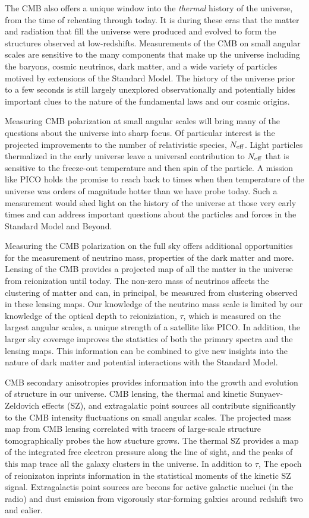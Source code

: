 \documentclass[PICOReport.tex]{subfiles}
\begin{document}
\vskip 10pt
The CMB also offers a unique window into the {\it thermal} history of the universe, from the time of reheating through today.  It is during these eras that the matter and radiation that fill the universe were produced and evolved to form the structures observed at low-redshifts.  Measurements of the CMB on small angular scales are sensitive to the many components that make up the universe including the baryons, cosmic neutrinos, dark matter, and a wide variety of particles motived by extensions of the Standard Model.  The history of the universe prior to a few seconds is still largely unexplored observationally and potentially hides important clues to the nature of the fundamental laws and our cosmic origins.

Measuring CMB polarization at small angular scales will bring many of the questions about the universe into sharp focus.  Of particular interest is the projected improvements to the number of relativistic species, ${N_{\rm eff}}$.  Light particles thermalized in the early universe leave a universal contribution to ${N_{\rm eff}}$ that is sensitive to the freeze-out temperature and then spin of the particle.  A mission like PICO holds the promise to reach back to times when then temperature of the universe was orders of magnitude hotter than we have probe today.  Such a measurement would shed light on the history of the universe at those very early times and can address important questions about the particles and forces in the Standard Model and Beyond.

Measuring the CMB polarization on the full sky offers additional opportunities for the measurement of neutrino mass, properties of the dark matter and more.  Lensing of the CMB provides a projected map of all the matter in the universe from reionization until today.  The non-zero mass of neutrinos affects the clustering of matter and can, in principal, be measured from clustering observed in these lensing maps.  Our knowledge of the neutrino mass scale is limited by our knowledge of the optical depth to reioniziation, $\tau$, which is measured on the largest angular scales, a unique strength of a satellite like PICO.  In addition, the larger sky coverage improves the statistics of both the primary spectra and the lensing maps.  This information can be combined to give new insights into the nature of dark matter and potential interactions with the Standard Model.

CMB secondary anisotropies provides information into the growth and evolution of structure in our universe. CMB lensing, the thermal and kinetic Sunyaev-Zeldovich effects (SZ), and extragalatic point sources all contribute significantly to the CMB intensity fluctuations on small angular scales. The projected mass map from CMB lensing correlated with tracers of large-scale structure tomographically probes the how stucture grows. The thermal SZ provides a map of the integrated free electron pressure along the line of sight, and the peaks of this map trace all the galaxy clusters in the universe. In addition to $\tau$, The epoch of reionizaton inprints information in the statistical moments of the kinetic SZ signal. Extragalactis point sources are becons for active galactic nucluei (in the radio) and dust emission from vigorously star-forming galxies around redshift two and ealier.
\end{document}
